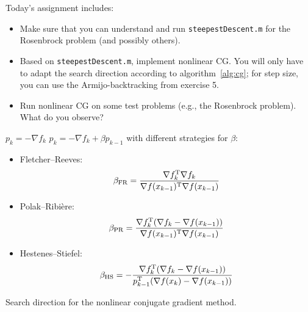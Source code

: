 Today's assignment includes:
\begin{itemize}
    \item Make sure that you can understand and run \texttt{steepestDescent.m}
      for the Rosenbrock problem (and possibly others).
    \item Based on \texttt{steepestDescent.m}, implement nonlinear CG. You
      will only have to adapt the search direction according to
      algorithm~\ref{alg:cg}; for step size, you can use the
      Armijo-backtracking from exercise 5.
    \item Run nonlinear CG on some test problems (e.g., the Rosenbrock
      problem). What do you observe?
\end{itemize}

\begin{algorithm}
  \begin{algorithmic}[1]
      \State $p_k = -\nabla f_k$
    \Else
      \State $p_k = -\nabla f_k + \beta p_{k-1}$
  with different strategies for $\beta$:
  \begin{itemize}
    \item Fletcher--Reeves:
      \[
        \beta_{\text{FR}}=\frac{\nabla f_k^{\text{\upshape T}} \nabla f_k}{\nabla f(x_{k-1})^{\text{\upshape T}} \nabla f(x_{k-1})}
        \]
       \item Polak--Ribi\`ere:
         \[
           \beta_{\text{PR}}=\frac{\nabla f_k^{\text{\upshape T}} (\nabla f_k-\nabla f(x_{k-1}))}{\nabla f(x_{k-1})^{\text{\upshape T}} \nabla f(x_{k-1})}
      \]
       \item Hestenes--Stiefel:
         \[
           \beta_{\text{HS}}=-\frac{\nabla f_k^{\text{\upshape T}} (\nabla f_k-\nabla f(x_{k-1}))}{p_{k-1}^{\text{\upshape T}} (\nabla f(x_{k}) - \nabla f(x_{k-1}))}
      \]
  \end{itemize}
    \EndIf
  \end{algorithmic}
  \caption{Search direction for the nonlinear conjugate gradient method.}
  \label{alg:cg}
\end{algorithm}






